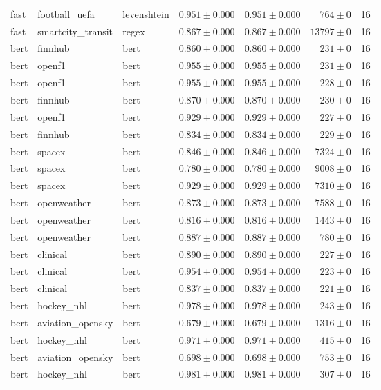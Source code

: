 \begin{table}[htbp]
\begin{tabular}{l l l r r r r}
fast & football\_uefa & levenshtein & $0.951\pm0.000$ & $0.951\pm0.000$ & $764\pm0$ & 16 \\
fast & smartcity\_transit & regex & $0.867\pm0.000$ & $0.867\pm0.000$ & $13797\pm0$ & 16 \\
bert & finnhub & bert & $0.860\pm0.000$ & $0.860\pm0.000$ & $231\pm0$ & 16 \\
bert & openf1 & bert & $0.955\pm0.000$ & $0.955\pm0.000$ & $231\pm0$ & 16 \\
bert & openf1 & bert & $0.955\pm0.000$ & $0.955\pm0.000$ & $228\pm0$ & 16 \\
bert & finnhub & bert & $0.870\pm0.000$ & $0.870\pm0.000$ & $230\pm0$ & 16 \\
bert & openf1 & bert & $0.929\pm0.000$ & $0.929\pm0.000$ & $227\pm0$ & 16 \\
bert & finnhub & bert & $0.834\pm0.000$ & $0.834\pm0.000$ & $229\pm0$ & 16 \\
bert & spacex & bert & $0.846\pm0.000$ & $0.846\pm0.000$ & $7324\pm0$ & 16 \\
bert & spacex & bert & $0.780\pm0.000$ & $0.780\pm0.000$ & $9008\pm0$ & 16 \\
bert & spacex & bert & $0.929\pm0.000$ & $0.929\pm0.000$ & $7310\pm0$ & 16 \\
bert & openweather & bert & $0.873\pm0.000$ & $0.873\pm0.000$ & $7588\pm0$ & 16 \\
bert & openweather & bert & $0.816\pm0.000$ & $0.816\pm0.000$ & $1443\pm0$ & 16 \\
bert & openweather & bert & $0.887\pm0.000$ & $0.887\pm0.000$ & $780\pm0$ & 16 \\
bert & clinical & bert & $0.890\pm0.000$ & $0.890\pm0.000$ & $227\pm0$ & 16 \\
bert & clinical & bert & $0.954\pm0.000$ & $0.954\pm0.000$ & $223\pm0$ & 16 \\
bert & clinical & bert & $0.837\pm0.000$ & $0.837\pm0.000$ & $221\pm0$ & 16 \\
bert & hockey\_nhl & bert & $0.978\pm0.000$ & $0.978\pm0.000$ & $243\pm0$ & 16 \\
bert & aviation\_opensky & bert & $0.679\pm0.000$ & $0.679\pm0.000$ & $1316\pm0$ & 16 \\
bert & hockey\_nhl & bert & $0.971\pm0.000$ & $0.971\pm0.000$ & $415\pm0$ & 16 \\
bert & aviation\_opensky & bert & $0.698\pm0.000$ & $0.698\pm0.000$ & $753\pm0$ & 16 \\
bert & hockey\_nhl & bert & $0.981\pm0.000$ & $0.981\pm0.000$ & $307\pm0$ & 16 \\

\end{tabular}
\end{table}
